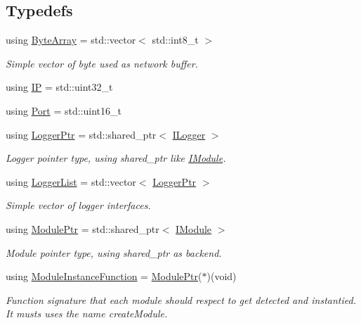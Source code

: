 \subsection*{Typedefs}
\begin{DoxyCompactItemize}
\item 
using \mbox{\hyperlink{namespaceo_z_abfa3f5a46e5c7584615dc1dd33fcafb6}{Byte\+Array}} = std\+::vector$<$ std\+::int8\+\_\+t $>$
\begin{DoxyCompactList}\small\item\em Simple vector of byte used as network buffer. \end{DoxyCompactList}\item 
using \mbox{\hyperlink{namespaceo_z_ace55c2d0182a14ceea9649d0d0cf9c4a}{IP}} = std\+::uint32\+\_\+t
\item 
using \mbox{\hyperlink{namespaceo_z_afeccb82d451972ba3b7d2a32b066b30b}{Port}} = std\+::uint16\+\_\+t
\item 
using \mbox{\hyperlink{namespaceo_z_aaa2fbabbfafc6616a7e69651b62a3d4e}{Logger\+Ptr}} = std\+::shared\+\_\+ptr$<$ \mbox{\hyperlink{classo_z_1_1_i_logger}{I\+Logger}} $>$
\begin{DoxyCompactList}\small\item\em Logger pointer type, using shared\+\_\+ptr like \mbox{\hyperlink{classo_z_1_1_i_module}{I\+Module}}. \end{DoxyCompactList}\item 
using \mbox{\hyperlink{namespaceo_z_a2d18a70272709242e8e7ebffc3f1806c}{Logger\+List}} = std\+::vector$<$ \mbox{\hyperlink{namespaceo_z_aaa2fbabbfafc6616a7e69651b62a3d4e}{Logger\+Ptr}} $>$
\begin{DoxyCompactList}\small\item\em Simple vector of logger interfaces. \end{DoxyCompactList}\item 
using \mbox{\hyperlink{namespaceo_z_af5a56aaaee027504979038f38991adcf}{Module\+Ptr}} = std\+::shared\+\_\+ptr$<$ \mbox{\hyperlink{classo_z_1_1_i_module}{I\+Module}} $>$
\begin{DoxyCompactList}\small\item\em Module pointer type, using shared\+\_\+ptr as backend. \end{DoxyCompactList}\item 
using \mbox{\hyperlink{namespaceo_z_ac1fa0fdab4bd08a5e127651d1f4150a2}{Module\+Instance\+Function}} = \mbox{\hyperlink{namespaceo_z_af5a56aaaee027504979038f38991adcf}{Module\+Ptr}}($\ast$)(void)
\begin{DoxyCompactList}\small\item\em Function signature that each module should respect to get detected and instantied. It musts uses the name \textquotesingle{}create\+Module\textquotesingle{}. \end{DoxyCompactList}\end{DoxyCompactItemize}
